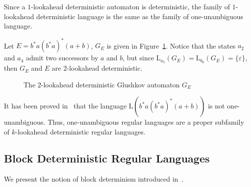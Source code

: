 \documentclass{llncs}
\begin{document}
	Since a $1$-lookahead deterministic automaton is deterministic, the family of $1$-lookahead deterministic language is the same as the family of one-unambiguous language.

\begin{example}
	Let $E = b^*a(b^*a)^*(a+b)$, $G_E$ is given in Figure~\ref{fg:Glushkov2LA}.
	Notice that the states $a_2$ and $a_4$ admit two successors by $a$ and $b$, but since $\mathrm{L}_{a_5}(G_E) = \mathrm{L}_{b_6}(G_E) = \{\varepsilon\}$, then $G_E$ and $E$ are $2$-lookahead deterministic. 
\end{example}


\begin{figure}[H]
	\centering
	

	\caption{The $2$-lookahead deterministic Glushkov automaton $G_E$}
	\label{fg:Glushkov2LA}
\end{figure}

	It has been proved in~\cite{HW08} that the language $\mathrm{L}(b^*a(b^*a)^*(a+b))$ is not one-unambiguous.
	Thus, one-unambiguous regular languages are a proper subfamily of $k$-lookahead deterministic regular languages.
		
	
\subsection{Block Deterministic Regular Languages}

	We present the notion of block determinism introduced in~\cite{GMW01}.
	
\end{document}
